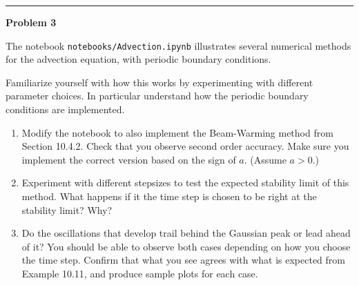 \documentclass[10pt]{article}
\begin{document}
\vskip 1cm
\hrule
{\bf Problem 3}  

The notebook \verb+notebooks/Advection.ipynb+ illustrates several numerical
methods for the advection equation, with periodic boundary conditions.

Familiarize yourself with how this works by experimenting with
different parameter choices.  In particular understand how the periodic
boundary conditions are implemented.

\begin{enumerate}
\item Modify the notebook to also implement the Beam-Warming method from
Section 10.4.2.  Check that you observe second order accuracy.  Make sure you
implement the correct version based on the sign of $a$.  (Assume $a>0$.)

\item
Experiment with different stepsizes to test the expected stability limit
of this method.  What happens if it the time step is chosen to be
right at the stability limit?  Why?

\item
Do the oscillations that develop trail behind the Gaussian peak or lead ahead
of it?  You should be able to observe both cases depending on how you choose
the time step.  Confirm that what you see agrees with what is expected 
from Example 10.11, and produce sample plots for each case.

\end{enumerate}




\end{document}
